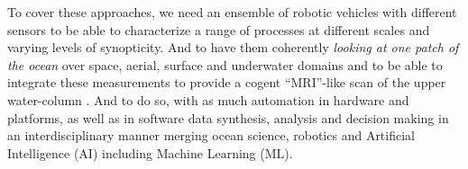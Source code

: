 To cover these approaches, we need an ensemble of robotic vehicles
with different sensors to be able to characterize a range of processes
at different scales and varying levels of synopticity. And to have
them coherently \emph{looking at one patch of the ocean} over space,
aerial, surface and underwater domains and to be able to integrate
these measurements to provide a cogent ``MRI''-like scan of the upper
water-column . And to do so, with as much automation in hardware and
platforms, as well as in software data synthesis, analysis and
decision making in an interdisciplinary manner merging ocean science,
robotics and Artificial Intelligence (AI) including Machine Learning
(ML).













